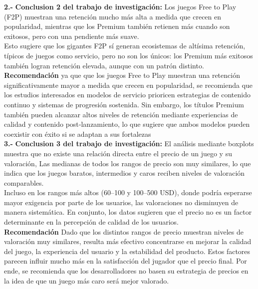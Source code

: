 \documentclass[oneside,11pt]{Latex/Classes/PhDthesisPSnPDF}
\begin{document}
\textbf{2.-} \textbf{Conclusion 2 del trabajo de investigación:} Los
juegos Free to Play (F2P) muestran una retención mucho más alta a medida
que crecen en popularidad, mientras que los Premium también retienen más
cuando son exitosos, pero con una pendiente más suave.\\

Esto sugiere que los gigantes F2P sí generan ecosistemas de altísima
retención, típicos de juegos como servicio, pero no son los únicos: los
Premium más exitosos también logran retención elevada, aunque con un
patrón distinto.\\

\textbf{Recomendación} ya que que los juegos Free to Play muestran una
retención significativamente mayor a medida que crecen en popularidad,
se recomienda que los estudios interesados en modelos de servicio
prioricen estrategias de contenido continuo y sistemas de progresión
sostenida. Sin embargo, los títulos Premium también pueden alcanzar
altos niveles de retención mediante experiencias de calidad y contenido
post‑lanzamiento, lo que sugiere que ambos modelos pueden coexistir con
éxito si se adaptan a sus fortalezas\\

\textbf{3.-} \textbf{Conclusion 3 del trabajo de investigación:} El
análisis mediante boxplots muestra que no existe una relación directa
entre el precio de un juego y su valoración, Las medianas de todos los
rangos de precio son muy similares, lo que indica que los juegos
baratos, intermedios y caros reciben niveles de valoración
comparables.\\

Incluso en los rangos más altos (60--100 y 100--500 USD), donde podría
esperarse mayor exigencia por parte de los usuarios, las valoraciones no
disminuyen de manera sistemática. En conjunto, los datos sugieren que el
precio no es un factor determinante en la percepción de calidad de los
usuarios.\\

\textbf{Recomendación} Dado que los distintos rangos de precio muestran
niveles de valoración muy similares, resulta más efectivo concentrarse
en mejorar la calidad del juego, la experiencia del usuario y la
estabilidad del producto. Estos factores parecen influir mucho más en la
satisfacción del jugador que el precio final. Por ende, se recomienda
que los desarrolladores no basen su estrategia de precios en la idea de
que un juego más caro será mejor valorado.\\
\end{document}
